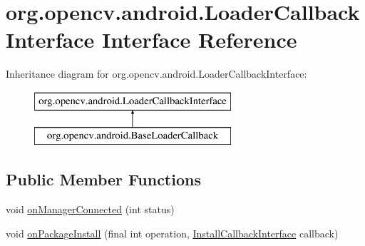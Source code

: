 \hypertarget{interfaceorg_1_1opencv_1_1android_1_1_loader_callback_interface}{}\section{org.\+opencv.\+android.\+Loader\+Callback\+Interface Interface Reference}
\label{interfaceorg_1_1opencv_1_1android_1_1_loader_callback_interface}
Inheritance diagram for org.\+opencv.\+android.\+Loader\+Callback\+Interface\+:\begin{figure}[H]
\begin{center}
\leavevmode
\includegraphics[height=2.000000cm]{interfaceorg_1_1opencv_1_1android_1_1_loader_callback_interface}
\end{center}
\end{figure}
\subsection*{Public Member Functions}
\begin{DoxyCompactItemize}
\item 
void \mbox{\hyperlink{interfaceorg_1_1opencv_1_1android_1_1_loader_callback_interface_ad2407cf1886354b965b8ebd97b7164ff}{on\+Manager\+Connected}} (int status)
\item 
void \mbox{\hyperlink{interfaceorg_1_1opencv_1_1android_1_1_loader_callback_interface_a996cd7844145b1e99ceeda27af9a6713}{on\+Package\+Install}} (final int operation, \mbox{\hyperlink{interfaceorg_1_1opencv_1_1android_1_1_install_callback_interface}{Install\+Callback\+Interface}} callback)
\end{DoxyCompactItemize}
